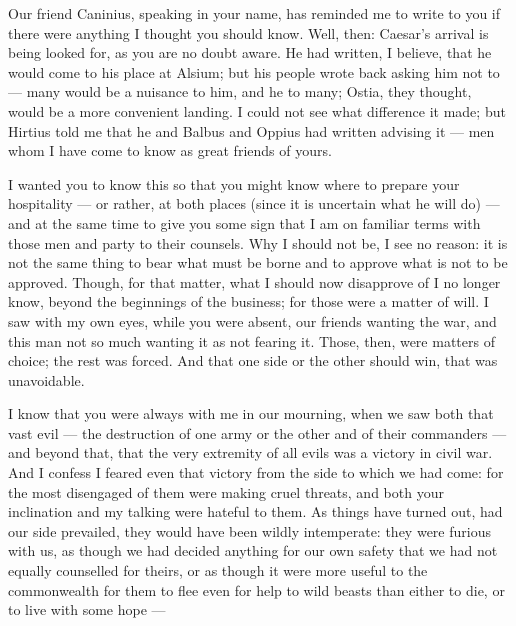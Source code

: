 

 Our friend Caninius, speaking in your name, has reminded me to write to you if there were anything I thought you should know. Well, then: Caesar's arrival is being looked for, as you are no doubt aware. He had written, I believe, that he would come to his place at Alsium; but his people wrote back asking him not to --- many would be a nuisance to him, and he to many; Ostia, they thought, would be a more convenient landing. I could not see what difference it made; but Hirtius told me that he and Balbus and Oppius had written advising it --- men whom I have come to know as great friends of yours.

 I wanted you to know this so that you might know where to prepare your hospitality --- or rather, at both places (since it is uncertain what he will do) --- and at the same time to give you some sign that I am on familiar terms with those men and party to their counsels. Why I should not be, I see no reason: it is not the same thing to bear what must be borne and to approve what is not to be approved. Though, for that matter, what I should now disapprove of I no longer know, beyond the beginnings of the business; for those were a matter of will. I saw with my own eyes, while you were absent, our friends wanting the war, and this man not so much wanting it as not fearing it. Those, then, were matters of choice; the rest was forced. And that one side or the other should win, that was unavoidable.

 I know that you were always with me in our mourning, when we saw both that vast evil --- the destruction of one army or the other and of their commanders --- and beyond that, that the very extremity of all evils was a victory in civil war. And I confess I feared even that victory from the side to which we had come: for the most disengaged of them were making cruel threats, and both your inclination and my talking were hateful to them. As things have turned out, had our side prevailed, they would have been wildly intemperate: they were furious with us, as though we had decided anything for our own safety that we had not equally counselled for theirs, or as though it were more useful to the commonwealth for them to flee even for help to wild beasts than either to die, or to live with some hope ---

